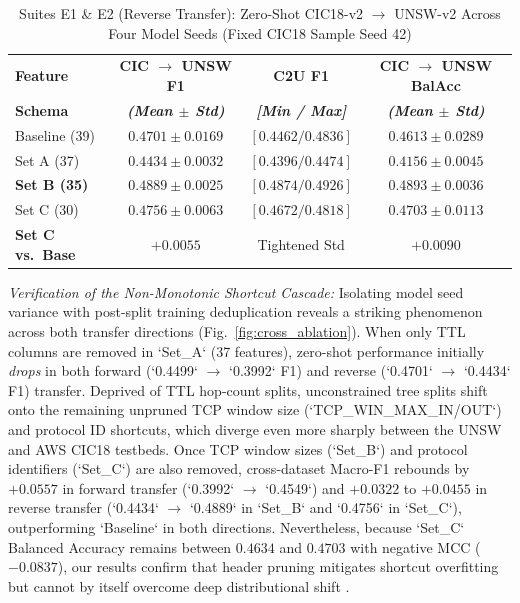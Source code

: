 ﻿\documentclass[conference]{IEEEtran}
\begin{document}
\begin{table}[t]
\caption{Suites E1 \& E2 (Reverse Transfer): Zero-Shot CIC18-v2 $\to$ UNSW-v2 Across Four Model Seeds (Fixed CIC18 Sample Seed 42)}
\begin{center}
\begin{tabular}{|l|c|c|c|}
\hline
\textbf{Feature} & \textbf{CIC $\to$ UNSW F1} & \textbf{C2U F1} & \textbf{CIC $\to$ UNSW BalAcc} \\
\textbf{Schema} & \textbf{\textit{(Mean $\pm$ Std)}} & \textbf{\textit{[Min / Max]}} & \textbf{\textit{(Mean $\pm$ Std)}} \\
\hline
Baseline (39) & $0.4701 \pm 0.0169$ & $[0.4462 / 0.4836]$ & $0.4613 \pm 0.0289$ \\
Set A (37) & $0.4434 \pm 0.0032$ & $[0.4396 / 0.4474]$ & $0.4156 \pm 0.0045$ \\
\textbf{Set B (35)} & $\mathbf{0.4889 \pm 0.0025}$ & $\mathbf{[0.4874 / 0.4926]}$ & $\mathbf{0.4893 \pm 0.0036}$ \\
Set C (30) & $0.4756 \pm 0.0063$ & $[0.4672 / 0.4818]$ & $0.4703 \pm 0.0113$ \\
\hline
\textbf{Set C vs.\ Base} & $+0.0055$ & Tightened Std & $+0.0090$ \\
\hline
\end{tabular}
\label{tab:e1_reverse}
\end{center}
\end{table}

\textit{Verification of the Non-Monotonic Shortcut Cascade:} Isolating model seed variance with post-split training deduplication reveals a striking phenomenon across both transfer directions (Fig.~\ref{fig:cross_ablation}). When only TTL columns are removed in `Set_A` (37 features), zero-shot performance initially \textit{drops} in both forward (`0.4499` $\to$ `0.3992` F1) and reverse (`0.4701` $\to$ `0.4434` F1) transfer. Deprived of TTL hop-count splits, unconstrained tree splits shift onto the remaining unpruned TCP window size (`TCP_WIN_MAX_IN/OUT`) and protocol ID shortcuts, which diverge even more sharply between the UNSW and AWS CIC18 testbeds. Once TCP window sizes (`Set_B`) and protocol identifiers (`Set_C`) are also removed, cross-dataset Macro-F1 rebounds by $+0.0557$ in forward transfer (`0.3992` $\to$ `0.4549`) and $+0.0322$ to $+0.0455$ in reverse transfer (`0.4434` $\to$ `0.4889` in `Set_B` and `0.4756` in `Set_C`), outperforming `Baseline` in both directions. Nevertheless, because `Set_C` Balanced Accuracy remains between $0.4634$ and $0.4703$ with negative MCC ($-0.0837$), our results confirm that header pruning mitigates shortcut overfitting but cannot by itself overcome deep distributional shift \cite{b6,b7}.
\end{document}
